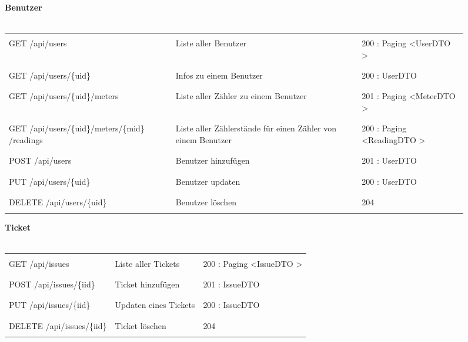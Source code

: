 \begin{figure}[H]
	\textbf{Benutzer}\\ \\
	\begin{tabularx}{\textwidth}{X | X | X}
		\hline &&\\
		GET /api/users & Liste aller Benutzer & 200 : Paging \textless UserDTO \textgreater
		\\&&\\ \hline &&\\
		GET /api/users/\{uid\} & Infos zu einem Benutzer & 200 : UserDTO
		\\&&\\ \hline &&\\
		GET /api/users/\{uid\}/meters & Liste aller Zähler zu einem Benutzer & 201 : Paging \textless MeterDTO \textgreater
		\\&&\\ \hline &&\\
		GET /api/users/\{uid\}/meters/\{mid\} /readings & Liste aller Zählerstände für einen Zähler von einem Benutzer &  200 : Paging \textless ReadingDTO \textgreater
		\\&&\\ \hline &&\\
		POST /api/users & Benutzer hinzufügen &201 : UserDTO
		\\&&\\ \hline &&\\
		PUT /api/users/\{uid\} & Benutzer updaten & 200 : UserDTO
		\\&&\\ \hline &&\\
		DELETE /api/users/\{uid\} & Benutzer löschen & 204 
		\\&&\\ \hline 
	\end{tabularx}
\end{figure}

\begin{figure}[H]
	\textbf{Ticket}\\ \\
	\begin{tabularx}{\textwidth}{X | X | X}
		\hline &&\\
		GET /api/issues & Liste aller Tickets & 200 : Paging \textless IssueDTO \textgreater
		\\&&\\ \hline &&\\
		POST /api/issues/\{iid\} & Ticket hinzufügen & 201 : IssueDTO
		\\&&\\ \hline &&\\
		PUT /api/issues/\{iid\} & Updaten eines Tickets & 200 : IssueDTO
		\\&&\\ \hline &&\\
		DELETE /api/issues/\{iid\} & Ticket löschen & 204 
		\\&&\\ \hline 
	\end{tabularx}
\end{figure}

